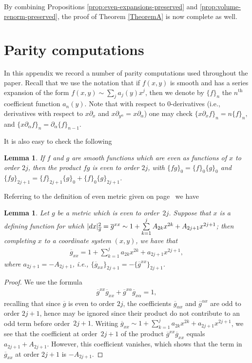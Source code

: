 \documentclass[11pt]{article}
\numberwithin{equation}{section}
\newtheorem{Lemma}[Theorem]{Lemma}
\newcommand{\olg}{\overline{g}}
\newcommand{\gbar}{\overline{g}}
\begin{document}
By combining Propositions \ref{prop:even-expansions-preserved} and \ref{prop:volume-renorm-preserved}, the proof of Theorem \ref{TheoremA} is now complete as well.


\setcounter{section}{5}
\setcounter{subsection}{2}
\setcounter{subsubsection}{0}
\setcounter{Theorem}{5}
\setcounter{equation}{0}
\appendix

\section{Parity computations} \label{appendix}

In this appendix we record a number of parity computations used throughout the paper. Recall that we use the notation that if $f(x,y)$ is smooth and has a series expansion of the form $f(x,y) \sim \sum_j a_j(y) x^j$, then we denote by $\{f\}_{n}$ the $n^{\mathrm{th}}$ coefficient function $a_n(y)$. Note that with respect to $0$-derivatives (i.e., derivatives with respect to $x \partial_x$ and $x \partial_{y^{\alpha}} = x \partial_{\alpha}$) one may check $\{ x \partial_x f\}_n = n \{f \}_{n},$ and $\{ x \partial_{{\alpha}} f \}_n = \partial_{{\alpha}} \{f\}_{n-1}.$

It is also easy to check the following
\begin{Lemma} \label{lemma:expansion} If $f$ and $g$ are smooth functions which are even as functions of $x$ to order $2j$, then the product $fg$ is even to order $2j$, with $\{ fg\}_0 = \{f\}_0\{g\}_0$ and $\{ fg\}_{2j+1} = \{ f \}_{2j+1} \{g\}_0 + \{f\}_0 \{g\}_{2j+1}$.
\end{Lemma}

Referring to the definition of even metric given on page~\pageref{defn-even} we have
\begin{Lemma} \label{appendix:first-odd-term-olgxx} Let $g$ be a metric which is even to order~$2j$. Suppose that $x$ is a defining function for which
$|{\rm d}x|^2_{\olg} = \olg^{xx} \sim 1 + \sum\limits_{k=1}^{j} A_{2k} x^{2k} + A_{2j+1} x^{2j+1}$; then completing $x$ to a coordinate system $(x,y)$, we have that
\begin{gather*}%
\olg_{xx} = 1 + \sum_{k=1}^{j} a_{2k} x^{2k} + a_{2j+1} x^{2j+1} ,
\end{gather*}
where $a_{2j+1} = -A_{2j+1}$, i.e., $\{ \gbar_{xx} \}_{2j+1} = - \{\gbar^{xx}\}_{2j+1}$.
\end{Lemma}
\begin{proof}We use the formula
\begin{gather*}%
\olg^{xx} \olg_{xx} + \olg^{x\alpha} \olg_{x\alpha} = 1,
\end{gather*}
recalling that since $\olg$ is even to order $2j$, the coefficients $\olg_{\alpha x}$ and $\olg^{\alpha x}$ are odd to order $2j+1$, hence may be ignored since their product do not contribute to an odd term before order~$2j+1$. Writing $\olg_{xx} \sim 1 + \sum\limits_{k=1}^{j} a_{2k} x^{2k} + a_{2j+1} x^{2j+1}$, we see that the coefficient at order~$2j+1$ of the product $\olg^{xx} \olg_{xx}$ equals $a_{2j+1} + A_{2j+1}$. However, this coefficient vanishes, which shows that the term in $\gbar_{xx} $ at order $2j+1$ is $-A_{2j+1}$.
\end{proof}
\end{document}
